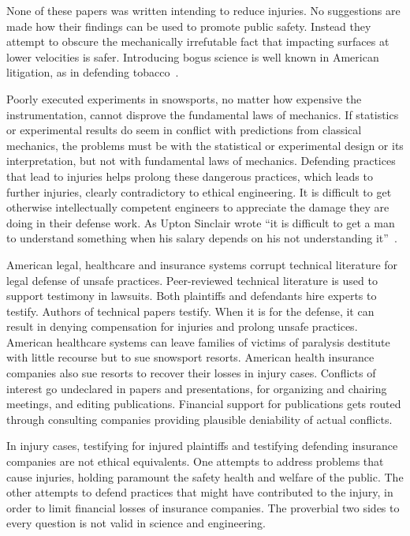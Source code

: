 \documentclass[smallextended]{svjour3}       %
\begin{document}
None of these papers was written intending to reduce injuries. No suggestions
are made how their findings can be used to promote public safety. Instead they
attempt to obscure the mechanically irrefutable fact that impacting surfaces at
lower velocities is safer. Introducing bogus science is well known in American
litigation, as in defending tobacco~\cite{Oreskes2010}.

Poorly executed experiments in snowsports, no matter how expensive the
instrumentation, cannot disprove the fundamental laws of mechanics. If statistics
or experimental results do seem in conflict with predictions from classical
mechanics, the problems must be with the statistical or experimental design or its
interpretation, but not with fundamental laws of mechanics. Defending practices
that lead to injuries helps prolong these dangerous practices, which leads to
further injuries, clearly contradictory to ethical engineering. It is difficult
to get otherwise intellectually competent engineers to appreciate the damage
they are doing in their defense work. As Upton Sinclair wrote ``it is difficult
to get a man to understand something when his salary depends on his not
understanding it''~\cite{Sinclair1994}.

American legal, healthcare and insurance systems corrupt technical literature
for legal defense of unsafe practices. Peer-reviewed technical literature is
used to support testimony in lawsuits. Both plaintiffs and defendants hire
experts to testify. Authors of technical papers testify. When it is for the
defense, it can result in denying compensation for injuries and prolong unsafe
practices. American healthcare systems can leave families of victims of
paralysis destitute with little recourse but to sue snowsport resorts. American
health insurance companies also sue resorts to recover their losses in injury
cases. Conflicts of interest go undeclared in papers and presentations, for
organizing and chairing meetings, and editing publications. Financial support for
publications gets routed through consulting companies providing plausible
deniability of actual conflicts.

In injury cases, testifying for injured plaintiffs and testifying defending
insurance companies are not ethical equivalents. One attempts to address
problems that cause injuries, holding paramount the safety health and welfare
of the public. The other attempts to defend practices that might have
contributed to the injury, in order to limit financial losses of insurance
companies. The proverbial two sides to every question is not valid in science
and engineering.
\end{document}
